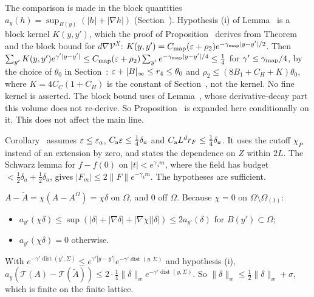 \begin{detail}\label{d8:ix19}
\begin{step}
The comparison is made in the block quantities $a_y(h)=\sup_{B(y)}(|h|+|\nabla h|)$ (Section~). Hypothesis (i) of Lemma~ is a block kernel $K(y,y')$, which the proof of Proposition~ derives from Theorem~ and the block bound for $d\nabla\mathcal V^X$: $K(y,y')=C_{\rm map}(\varepsilon+\rho_2)e^{-\gamma_{\rm map}|y-y'|/2}$. Then $\sum_{y'}K(y,y')e^{\gamma'|y-y'|}\le C_{\rm map}(\varepsilon+\rho_2)\sum_{y'}e^{-\gamma_{\rm map}|y-y'|/4}\le\frac14$ for $\gamma'\le\gamma_{\rm map}/4$, by the choice of $\theta_0$ in Section~: $\varepsilon+|B|_\infty\le r_4\le\theta_0$ and $\rho_2\le(8B_1+C_H+K)\theta_0$, where $K=4C_C(1+C_H)$ is the constant of Section~, not the kernel. No fine kernel is asserted. The block bound uses  of Lemma~, whose derivative-decay part this volume does not re-derive. So Proposition~ is expanded here conditionally on it. This does not affect the main line.
\end{step}
\begin{step}
Corollary~ assumes $\varepsilon\le\varepsilon_a$, $C_{\rm a}\varepsilon\le\frac14\delta_a$ and $C_{\rm a}L^dr_F\le\frac14\delta_a$. It uses the cutoff $\chi_P$ instead of an extension by zero, and states the dependence on $Z$ within $2L$. The Schwarz lemma for $f-f(0)$ on $|t|<e^{\gamma_4m}$, where the field has budget $<\frac12\delta_a+\frac12\delta_a$, gives $|F_m|\le2\|F\|e^{-\gamma_4m}$. The hypotheses are sufficient.
\end{step}
\begin{step}
$A-\tilde A=\chi(A-A^\Omega)=\chi\delta$ on $\Omega$, and $0$ off $\Omega$. Because $\chi=0$ on $\Omega\setminus\Omega_{(1)}$:
\begin{itemize}
\item $a_{y'}(\chi\delta)\le\sup(|\delta|+|\nabla\delta|+|\nabla\chi||\delta|)\le2a_{y'}(\delta)$ for $B(y')\subset\Omega$;
\item $a_{y'}(\chi\delta)=0$ otherwise.
\end{itemize}
With $e^{-\gamma'\operatorname{dist}(y',\Sigma)}\le e^{\gamma'|y-y'|}e^{-\gamma'\operatorname{dist}(y,\Sigma)}$ and hypothesis (i), $a_y(\mathcal T(A)-\mathcal T(\tilde A))\le2\cdot\frac14\|\delta\|_we^{-\gamma'\operatorname{dist}(y,\Sigma)}$. So $\|\delta\|_w\le\frac12\|\delta\|_w+\sigma$, which is finite on the finite lattice.
\end{step}
\end{detail}


